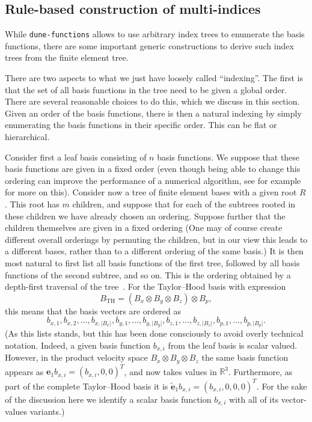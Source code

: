\documentclass[a4paper,10pt,headings=normal,bibliography=totoc]{scrartcl}
\newcommand{\R}{\mathbb{R}}
\newcommand{\abs}[1]{{\lvert#1\rvert}}
\newcommand{\dunemodule}[1]{\texttt{#1}}
\newcommand{\todosander}[1]{\todo[inline,color=orange,author=OS]{#1}}
\begin{document}
\subsection{Rule-based construction of multi-indices}

While \dunemodule{dune-functions} allows to use arbitrary index trees
to enumerate the basis functions, there are some important generic constructions
to derive such index trees from the finite element tree.


\todosander{Rewrite this section to match the new section title}

There are two aspects to what we just have loosely called ``indexing''.  The first is that the set of all basis functions
in the tree need to be given a global order.  There are several reasonable choices to do this, which we discuss
in this section.
Given an order of the basis functions, there is then a natural indexing by simply enumerating the basis functions in
their specific order. This can be flat or hierarchical.

Consider first a leaf basis consisting of $n$ basis functions.  We suppose that these basis functions are given in a fixed
order (even though being able to change this ordering can improve the performance of a numerical
algorithm, see for example \cite{bader:2013,ordering_for_gauss_seidel} for more on this).
Consider now a tree of finite element bases with a given root $R$.  This root has $m$ children, and suppose that for
each of the subtrees rooted in these children we have already chosen an ordering.  Suppose further that the children themselves are given
in a fixed ordering (One may of course create different overall orderings by permuting the children, but in our view
this leads to a different bases, rather than to a different ordering of the same basis.)  It is then most natural
to first list all basis functions of the first tree, followed by all basis functions of the second subtree,
and so on.  This is the ordering obtained by a depth-first traversal of the tree~\cite{cormen:1990}.
For the Taylor--Hood basis with expression
\begin{equation*}
 B_\text{TH}
 =
 (B_x \otimes B_y \otimes B_z) \otimes B_p,
\end{equation*}
this means that the basis vectors are ordered as
\begin{equation*}
 b_{x,1}, b_{x,2}, \dots, b_{x,\abs{B_x}},
 b_{y,1}, \dots, b_{y,\abs{B_y}},
 b_{z,1}, \dots, b_{z,\abs{B_z}},
 b_{p,1}, \dots, b_{p,\abs{B_p}}.
\end{equation*}
(As this lists stands, but this has been done consciously to avoid overly technical notation.  Indeed, a given basis
function $b_{x,i}$ from the leaf basis is scalar valued.  However, in the product velocity space
$B_x \otimes B_y \otimes B_z$ the same basis function appears as $\mathbf{e}_1 b_{x,i} = (b_{x,i},0,0)^T$,
and now takes values in $\R^3$.  Furthermore, as part of the complete Taylor--Hood basis it is
$\tilde{\mathbf{e}}_1 b_{x,i} = (b_{x,i},0,0,0)^T$.  For the sake of the discussion here we identify a scalar
basis function $b_{x,i}$ with all of its vector-values variants.)
\end{document}
